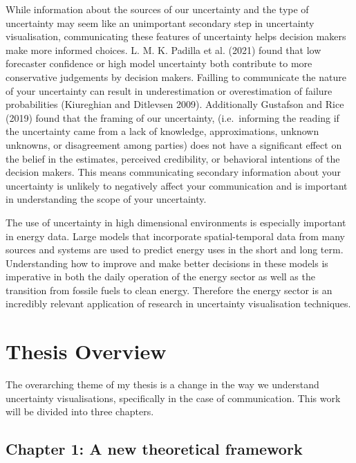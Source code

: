 \documentclass[
  letterpaper,
  DIV=11,
  numbers=noendperiod]{scrartcl}
\begin{document}
While information about the sources of our uncertainty and the type of
uncertainty may seem like an unimportant secondary step in uncertainty
visualisation, communicating these features of uncertainty helps
decision makers make more informed choices. L. M. K. Padilla et al.
(2021) found that low forecaster confidence or high model uncertainty
both contribute to more conservative judgements by decision makers.
Failling to communicate the nature of your uncertainty can result in
underestimation or overestimation of failure probabilities (Kiureghian
and Ditlevsen 2009). Additionally Gustafson and Rice (2019) found that
the framing of our uncertainty, (i.e.~informing the reading if the
uncertainty came from a lack of knowledge, approximations, unknown
unknowns, or disagreement among parties) does not have a significant
effect on the belief in the estimates, perceived credibility, or
behavioral intentions of the decision makers. This means communicating
secondary information about your uncertainty is unlikely to negatively
affect your communication and is important in understanding the scope of
your uncertainty.

The use of uncertainty in high dimensional environments is especially
important in energy data. Large models that incorporate spatial-temporal
data from many sources and systems are used to predict energy uses in
the short and long term. Understanding how to improve and make better
decisions in these models is imperative in both the daily operation of
the energy sector as well as the transition from fossile fuels to clean
energy. Therefore the energy sector is an incredibly relevant
application of research in uncertainty visualisation techniques.

\newpage{}

\hypertarget{thesis-overview}{%
\section{Thesis Overview}\label{thesis-overview}}

The overarching theme of my thesis is a change in the way we understand
uncertainty visualisations, specifically in the case of communication.
This work will be divided into three chapters.

\hypertarget{chapter-1-a-new-theoretical-framework}{%
\subsection{Chapter 1: A new theoretical
framework}\label{chapter-1-a-new-theoretical-framework}}
\end{document}
